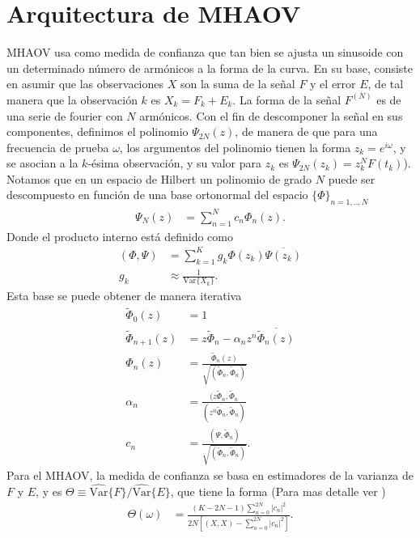 \section{Arquitectura de MHAOV}\label{sec:arquitectura-mhaov}
MHAOV usa como medida de confianza que tan bien se ajusta un sinusoide con un determinado número de armónicos a la forma de la curva. En su base, consiste en asumir que las observaciones $X$ son la suma de la señal $F$ y el error $E$, de tal manera que la observación $k$ es $X_k= F_k+E_k$. La forma de la señal $F^{(N)}$ es de una serie de fourier con $N$ armónicos. Con el fin de descomponer la señal en sus componentes, definimos el polinomio $\Psi_{2N}(z)$, de manera de que para una frecuencia de prueba $\omega$, los argumentos del polinomio tienen la forma $z_k = e^{i \omega}$, y se asocian a la $k$-ésima observación, y su valor para $z_k$  es $\Psi_{2N}(z_k)=z_k^N F(t_k)$). Notamos que en un espacio de Hilbert un polinomio de grado $N$ puede ser descompuesto en función de una base ortonormal del espacio $\{\Phi\}_{n=1,..,N}$
\begin{align}
    \Psi_N(z) &= \sum_{n=1}^{N} c_n \Phi_n(z)
.\end{align}
Donde el producto interno está definido como
\begin{align}
    (\Phi, \Psi) &= \sum_{k=1}^{K} g_k \Phi(z_k) \overline {\Psi(z_k)} \label{eq:scalar-product}\\
    g_k &\approx \frac{1}{\mbox{Var}\{X_k\}} \nonumber 
.\end{align}
Esta base se puede obtener de manera iterativa
\begin{align}
    \tilde{ \Phi }_0(z)  &= 1 \\
    \tilde{ \Phi }_{n+1}(z)  &= z \tilde{ \Phi}_n-\alpha_n z^n \overline{\tilde{\Phi}_n(z) } \label{eq:recurrence} \\ 
\Phi_n(z) &= \frac{\tilde{ \Phi}_n(z) }{\sqrt{(\tilde{\Phi}_n, \tilde{\Phi}_n)}}\\
\alpha_n &= \frac{(z\tilde{\Phi}_n, \tilde{\Phi}_n }{(z^n \overline{\tilde{\Phi}_n}, \tilde{\Phi}_n)} \label{eq:alpha} \\
c_n &= \frac{(\Psi, \tilde{\Phi}_n)}{\sqrt{(\tilde{\Phi}_n, \tilde{\Phi}_n)}} \label{eq:c}
.\end{align}
Para el MHAOV, la medida de confianza se basa en estimadores de la varianza de $F$ y $E$, y es $\Theta \equiv \widehat{\mbox{Var}} \{F\}/\widehat{\mbox{Var}} \{E\}$, que tiene la forma (Para mas detalle ver \cite{MHAOV})
\begin{align}
    \Theta(\omega) &= \frac{(K - 2N - 1) \sum_{n=0}^{2N} |c_n|^2}{2N[(X,X)- \sum_{n=0}^{2N} |c_n|^2]} \label{eq:theta} 
.\end{align}

